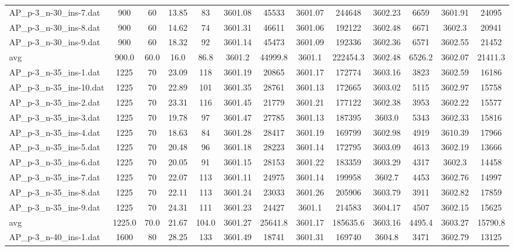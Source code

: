 \begin{table}[!ht]
{\begin{tabular}{lcccccccccccc}
AP\_p-3\_n-30\_ins-7.dat & 900 & 60 & 13.85 & 83 & 3601.08 & 45533 & 3601.07 & 244648 & 3602.23 & 6659 & 3601.91 & 24095 \\
AP\_p-3\_n-30\_ins-8.dat & 900 & 60 & 14.62 & 74 & 3601.31 & 46611 & 3601.06 & 192122 & 3602.48 & 6671 & 3602.3 & 20941 \\
AP\_p-3\_n-30\_ins-9.dat & 900 & 60 & 18.32 & 92 & 3601.14 & 45473 & 3601.09 & 192336 & 3602.36 & 6571 & 3602.55 & 21452 \\
\hline avg & 900.0 & 60.0 & 16.0& 86.8 & 3601.2& 44999.8 & 3601.1& 222454.3 & 3602.48& 6526.2 & 3602.07& 21411.3\\ \hline
AP\_p-3\_n-35\_ins-1.dat & 1225 & 70 & 23.09 & 118 & 3601.19 & 20865 & 3601.17 & 172774 & 3603.16 & 3823 & 3602.59 & 16186 \\
AP\_p-3\_n-35\_ins-10.dat & 1225 & 70 & 22.89 & 101 & 3601.35 & 28761 & 3601.13 & 172665 & 3603.02 & 5115 & 3602.97 & 15758 \\
AP\_p-3\_n-35\_ins-2.dat & 1225 & 70 & 23.31 & 116 & 3601.45 & 21779 & 3601.21 & 177122 & 3602.38 & 3953 & 3602.22 & 15577 \\
AP\_p-3\_n-35\_ins-3.dat & 1225 & 70 & 19.78 & 97 & 3601.47 & 27785 & 3601.13 & 187395 & 3603.0 & 5343 & 3602.33 & 15816 \\
AP\_p-3\_n-35\_ins-4.dat & 1225 & 70 & 18.63 & 84 & 3601.28 & 28417 & 3601.19 & 169799 & 3602.98 & 4919 & 3610.39 & 17966 \\
AP\_p-3\_n-35\_ins-5.dat & 1225 & 70 & 20.48 & 96 & 3601.18 & 28223 & 3601.14 & 172795 & 3603.09 & 4613 & 3602.19 & 13666 \\
AP\_p-3\_n-35\_ins-6.dat & 1225 & 70 & 20.05 & 91 & 3601.15 & 28153 & 3601.22 & 183359 & 3603.29 & 4317 & 3602.3 & 14458 \\
AP\_p-3\_n-35\_ins-7.dat & 1225 & 70 & 22.07 & 113 & 3601.11 & 24975 & 3601.14 & 199958 & 3602.7 & 4453 & 3602.76 & 14997 \\
AP\_p-3\_n-35\_ins-8.dat & 1225 & 70 & 22.11 & 113 & 3601.24 & 23033 & 3601.26 & 205906 & 3603.79 & 3911 & 3602.82 & 17859 \\
AP\_p-3\_n-35\_ins-9.dat & 1225 & 70 & 24.31 & 111 & 3601.23 & 24427 & 3601.1 & 214583 & 3604.17 & 4507 & 3602.15 & 15625 \\
\hline avg & 1225.0 & 70.0 & 21.67& 104.0 & 3601.27& 25641.8 & 3601.17& 185635.6 & 3603.16& 4495.4 & 3603.27& 15790.8\\ \hline
AP\_p-3\_n-40\_ins-1.dat & 1600 & 80 & 28.25 & 133 & 3601.49 & 18741 & 3601.31 & 169740 & 3604.8 & 3471 & 3602.79 & 13125 \\

\end{tabular}}
\end{table}
